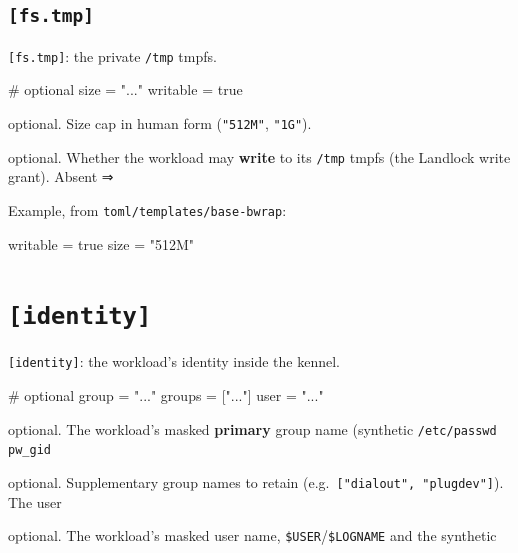\hypertarget{fs.tmp}{%
\subsection{\texorpdfstring{\texttt{{[}fs.tmp{]}}}{{[}fs.tmp{]}}}\label{fs.tmp}}

\texttt{{[}fs.tmp{]}}: the private \texttt{/tmp} tmpfs.

\begin{kennelcode}
[fs.tmp]
# optional
size     = "..."
writable = true
\end{kennelcode}

\begin{description}
\tightlist
\item[\texttt{size}]
optional. Size cap in human form (\texttt{"512M"}, \texttt{"1G"}).
\item[\texttt{writable}]
optional. Whether the workload may \textbf{write} to its \texttt{/tmp}
tmpfs (the Landlock write grant). Absent ⇒
\end{description}

Example, from \texttt{toml/templates/base-bwrap}:

\begin{kennelcode}
[fs.tmp]
writable = true
size = "512M"
\end{kennelcode}

\hypertarget{identity}{%
\section{\texorpdfstring{\texttt{{[}identity{]}}}{{[}identity{]}}}\label{identity}}

\texttt{{[}identity{]}}: the workload's identity inside the kennel.

\begin{kennelcode}
[identity]
# optional
group    = "..."
groups   = ["..."]
user     = "..."
\end{kennelcode}

\begin{description}
\tightlist
\item[\texttt{group}]
optional. The workload's masked \textbf{primary} group name (synthetic
\texttt{/etc/passwd} \texttt{pw\_gid}
\item[\texttt{groups}]
optional. Supplementary group names to retain
(e.g.~\texttt{{[}"dialout",\ "plugdev"{]}}). The user
\item[\texttt{user}]
optional. The workload's masked user name,
\texttt{\$USER}/\texttt{\$LOGNAME} and the synthetic
\end{description}

